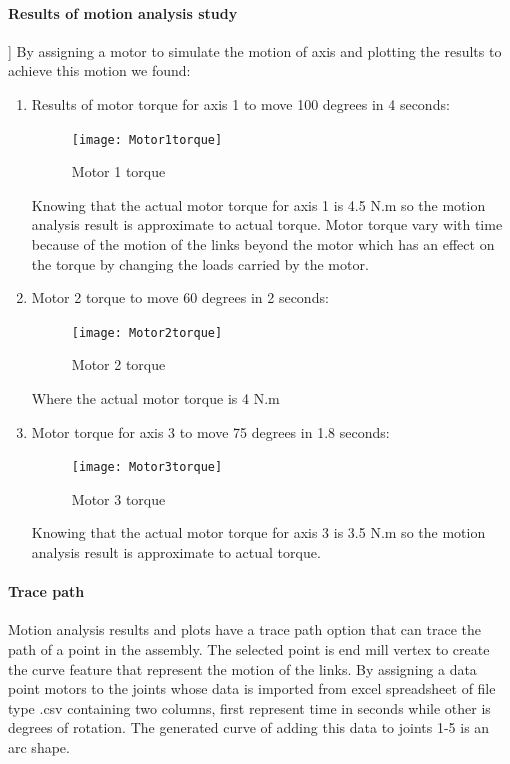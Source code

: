 \bigskip
\paragraph{Results of motion analysis study}] 
By assigning a motor to simulate the motion of axis and plotting the results to achieve this motion we found:
\begin{enumerate}
	\item Results of motor torque for axis 1 to move 100 degrees in 4 seconds:

	\begin{figure}[H]
		\centering
		\texttt{[image: Motor1torque]}
		\caption{Motor 1 torque}
	\end{figure}
	
	\smallskip
Knowing that the actual motor torque for axis 1 is 4.5 N.m so the motion analysis result is approximate to actual torque. 
\newline Motor torque vary with time because of the motion of the links beyond the motor which has an effect on the torque by changing the loads carried by the motor.
\smallskip
	\item Motor 2 torque to move 60 degrees in 2 seconds:
	\begin{figure}[H]
		\centering
		\texttt{[image: Motor2torque]}
		\caption{Motor 2 torque}
	\end{figure}
	
	Where the actual motor torque is 4 N.m

\smallskip
	\item Motor torque for axis 3 to move 75 degrees in 1.8 seconds:
	\begin{figure}[H]
		\centering
		\texttt{[image: Motor3torque]}
		\caption{Motor 3 torque}
	\end{figure}
	
	Knowing that the actual motor torque for axis 3 is 3.5 N.m so the motion analysis result is approximate to actual torque.
\end{enumerate}

\bigskip
\paragraph{Trace path}
Motion analysis results and plots have a trace path option that can trace the path of a point in the assembly. The selected point is end mill vertex to create the curve feature that represent the motion of the links.  By assigning a data point motors to the joints whose data is imported from excel spreadsheet of file type .csv containing two columns, first represent time in seconds while other is degrees of rotation. The generated curve of adding this data to joints 1-5 is an arc shape.

